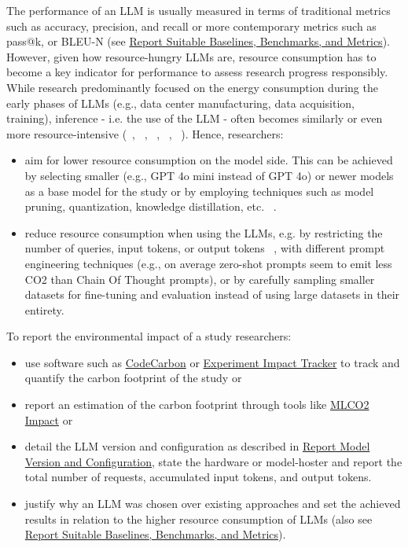 The performance of an LLM is usually measured in terms of traditional metrics such as accuracy, precision, and recall or more contemporary metrics such as pass@k, or BLEU-N (see \href{/guidelines/report-baselines-benchmarks-and-metrics}{Report Suitable Baselines, Benchmarks, and Metrics}). However, given how resource-hungry LLMs are, resource consumption has to become a key indicator for performance to assess research progress responsibly. 
While research predominantly focused on the energy consumption during the early phases of LLMs (e.g., data center manufacturing, data acquisition, training), inference - i.e. the use of the LLM - often becomes similarly or even more resource-intensive (~\cite{de2023growing}, ~\cite{DBLP:conf/mlsys/WuRGAAMCBHBGGOM22}, ~\cite{DBLP:journals/corr/abs-2410-02950}, ~\cite{JIANG2024202}, ~\cite{mitu2024hidden}).
Hence, researchers:
\begin{itemize}
  \item \should aim for lower resource consumption on the model side. This can be achieved by selecting smaller (e.g., GPT 4o mini instead of GPT 4o) or newer models as a base model for the study or by employing techniques such as model pruning, quantization, knowledge distillation, etc. ~\cite{mitu2024hidden}.
  \item \should reduce resource consumption when using the LLMs, e.g. by restricting the number of queries, input tokens, or output tokens ~\cite{mitu2024hidden}, with different prompt engineering techniques (e.g., on average zero-shot prompts seem to emit less CO2 than Chain Of Thought prompts), or by carefully sampling smaller datasets for fine-tuning and evaluation instead of using large datasets in their entirety.
\end{itemize}
To report the environmental impact of a study researchers:
\begin{itemize}
    \item \should use software such as \href{https://github.com/mlco2/codecarbon}{CodeCarbon} or \href{experiment-impact-tracker}{Experiment Impact Tracker} to track and quantify the carbon footprint of the study or
    \item \should report an estimation of the carbon footprint through tools like \href{https://mlco2.github.io/impact/#about}{MLCO2 Impact} or
    \item \should detail the LLM version and configuration as described in \href{/guidelines/report-version-and-configuration}{Report Model Version and Configuration}, state the hardware or model-hoster and report the total number of requests, accumulated input tokens, and output tokens.
    \item \must justify why an LLM was chosen over existing approaches and set the achieved results in relation to the higher resource consumption of LLMs (also see \href{/guidelines/report-baselines-benchmarks-and-metrics}{Report Suitable Baselines, Benchmarks, and Metrics}).
\end{itemize}

